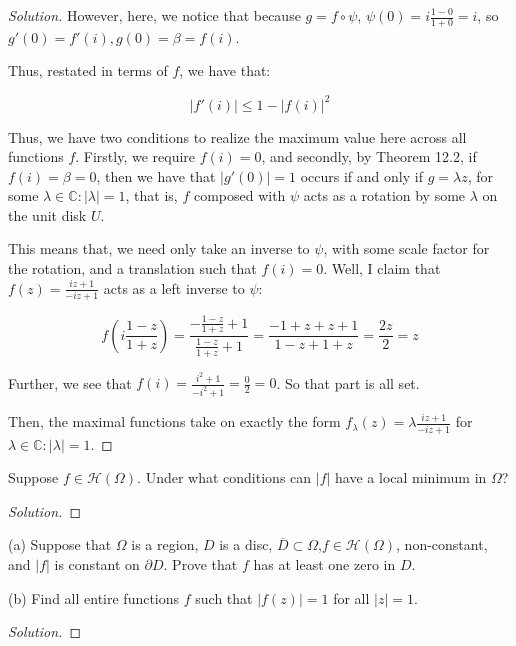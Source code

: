 \documentclass[10pt]{article}
\newenvironment{problem}[2][]{\begin{trivlist}
\item[\hskip \labelsep {\bfseries #1}\hskip \labelsep {\bfseries #2.}]}{\end{trivlist}}
\begin{document}
\begin{proof}[Solution]
However, here, we notice that because $g = f \circ \psi$, $\psi(0) = i \frac{ 1 - 0}{ 1+ 0} = i$, so $g'(0) = f'(i), g(0) = \beta = f(i)$. 

Thus, restated in terms of $f$, we have that:

$$ |f'(i)| \leq 1 - | f(i)|^2 $$

Thus, we have two conditions to realize the maximum value here across all functions $f$. Firstly, we require $f(i) = 0$, and secondly, by Theorem 12.2, if $f(i)= \beta = 0$, then we have that $|g'(0)|  = 1$ occurs if and only if $g = \lambda z$, for some $\lambda \in \mathbb{C} : | \lambda | = 1$, that is, $f$ composed with $\psi$ acts as a rotation by some $\lambda$ on the unit disk $U$. 

This means that, we need only take an inverse to $\psi$, with some scale factor for the rotation, and a translation such that $f(i) = 0$. Well, I claim that $f(z) = \frac{iz + 1}{-iz + 1}$ acts as a left inverse to $\psi$:

$$ f\left(i \frac{1-z}{1+z}\right) = \frac{- \frac{1-z}{1+z} + 1}{ \frac{1-z}{1+z} +1} = \frac{ -1 + z + z + 1}{ 1-z + 1 + z} = \frac{2z}{2} = z$$

Further, we see that $f(i) = \frac{i^2 + 1}{-i^2 + 1} = \frac{0}{2} = 0$. So that part is all set.

Then, the maximal functions take on exactly the form $f_\lambda(z) = \lambda  \frac{iz + 1}{-iz + 1}$ for $\lambda \in \mathbb{C} : |\lambda| = 1$. 

\end{proof}

\begin{problem}{Question 4}

Suppose $f \in \mathcal{H}(\Omega)$. Under what conditions can $|f|$ have a local minimum in $\Omega$?

\end{problem}
 
\begin{proof}[Solution]

\end{proof}
  

\begin{problem}{Question 5}

(a) Suppose that $\Omega$ is a region, $D$ is a disc, $\overline{D} \subset \Omega$,$f \in \mathcal{H}(\Omega)$, non-constant, and $|f|$ is constant on $\partial D$. Prove that $f$ has at least one zero in $D$. 

(b) Find all entire functions $f$ such that $|f(z)|  =1 $ for all $|z| = 1$. 

\end{problem}

\begin{proof}[Solution]

\end{proof}
\end{document}
